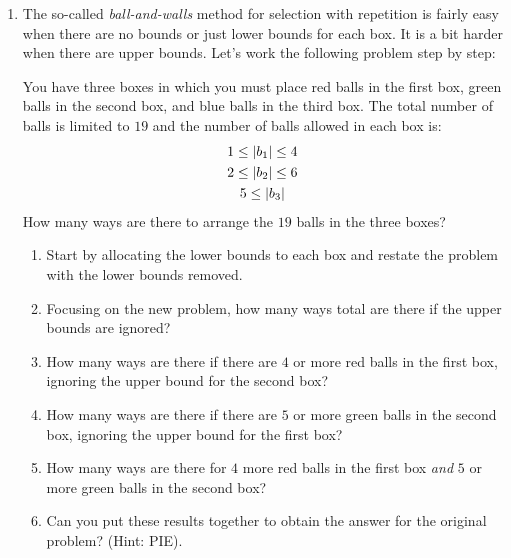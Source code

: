 \documentclass[letterpaper,12pt,fleqn]{article}
\begin{document}
\begin{enumerate}[left=0in,itemsep=0.5in]
\item The so-called \emph{ball-and-walls} method for selection with repetition is fairly easy when there are
  no bounds or just lower bounds for each box.  It is a bit harder when there are upper bounds.  Let's work the
  following problem step by step:

  You have three boxes in which you must place red balls in the first box, green balls in the second box, and
  blue balls in the third box.  The total number of balls is limited to \(19\) and the number of balls allowed in
  each box is:
  \begin{gather*}
    1\le\lvert b_1\rvert\le4 \\
    2\le\lvert b_2\rvert\le6 \\
    5\le\lvert b_3\rvert
  \end{gather*}
  How many ways are there to arrange the \(19\) balls in the three boxes?
  \begin{enumerate}
  \item Start by allocating the lower bounds to each box and restate the problem with the lower bounds removed.
  \item Focusing on the new problem, how many ways total are there if the upper bounds are ignored?
  \item How many ways are there if there are \(4\) or more red balls in the first box, ignoring the upper
    bound for the second box?
  \item How many ways are there if there are \(5\) or more green balls in the second box, ignoring the upper
    bound for the first box?
  \item How many ways are there for \(4\) more red balls in the first box \emph{and} \(5\) or more green balls in
    the second box?
  \item Can you put these results together to obtain the answer for the original problem?  (Hint: PIE).
  \end{enumerate}
\end{enumerate}
\end{document}
